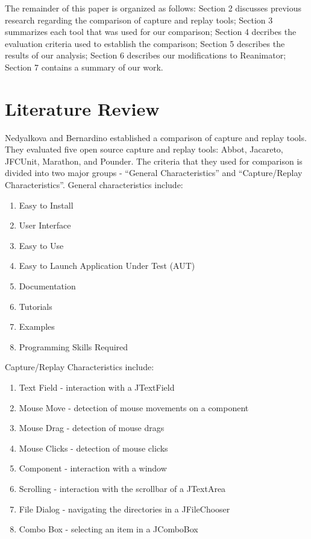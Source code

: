 \documentclass[12pt,journal]{IEEEtran}
\begin{document}
\par
The remainder of this paper is organized as follows: Section 2 discusses previous research regarding the comparison of capture and replay tools; Section 3 summarizes each tool that was used for our comparison; Section 4 decribes the evaluation criteria used to establish the comparison; Section 5 describes the results of our analysis; Section 6 describes our modifications to Reanimator; Section 7 contains a summary of our work.

\section{Literature Review}
Nedyalkova and Bernardino established a comparison of capture and replay tools. They evaluated five open source capture and replay tools: Abbot, Jacareto, JFCUnit, Marathon, and Pounder. The criteria that they used for comparison is divided into two major groups - ``General Characteristics'' and ``Capture/Replay Characteristics''. General characteristics include:
\begin{enumerate}
\item Easy to Install
\item User Interface
\item Easy to Use
\item Easy to Launch Application Under Test (AUT)
\item Documentation
\item Tutorials
\item Examples
\item Programming Skills Required
\end{enumerate}
Capture/Replay Characteristics include:
\begin{enumerate}
\item Text Field - interaction with a JTextField
\item Mouse Move - detection of mouse movements on a component
\item Mouse Drag - detection of mouse drags
\item Mouse Clicks - detection of mouse clicks
\item Component - interaction with a window
\item Scrolling - interaction with the scrollbar of a JTextArea
\item File Dialog - navigating the directories in a JFileChooser
\item Combo Box - selecting an item in a JComboBox
\end{enumerate}
\end{document}
